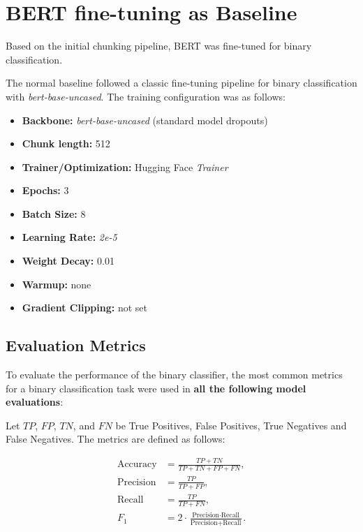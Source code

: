 
\section{BERT fine-tuning as Baseline}

Based on the initial chunking pipeline, BERT was fine-tuned for binary classification. 

The normal baseline followed a classic fine-tuning pipeline for binary classification with \textit{bert-base-uncased}. The training configuration was as follows:

\begin{itemize}
  \item \textbf{Backbone:} \textit{bert-base-uncased} (standard model dropouts)
  \item \textbf{Chunk length:} 512
  \item \textbf{Trainer/Optimization:} Hugging Face \textit{Trainer}
  \item \textbf{Epochs:} 3
  \item \textbf{Batch Size:} 8 
  \item \textbf{Learning Rate:} \textit{2e-5}
  \item \textbf{Weight Decay:} 0.01
  \item \textbf{Warmup:} none
  \item \textbf{Gradient Clipping:} not set
\end{itemize}



\subsection{Evaluation Metrics}
To evaluate the performance of the binary classifier, the most common metrics for a binary classification task were used in \textbf{all the following model evaluations}:

Let $TP$, $FP$, $TN$, and $FN$ be True Positives, False Positives, True Negatives and False Negatives. 
The metrics are defined as follows:

\begin{align}
\text{Accuracy} &= \frac{TP + TN}{TP + TN + FP + FN}, \\
\text{Precision} &= \frac{TP}{TP + FP}, \\
\text{Recall} &= \frac{TP}{TP + FN}, \\
F_{1} &= 2 \cdot \frac{\text{Precision} \cdot \text{Recall}}{\text{Precision} + \text{Recall}}.
\end{align}

